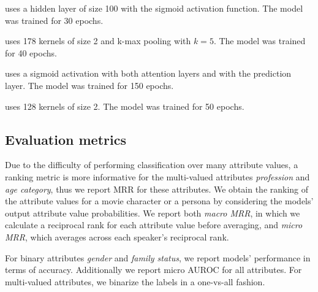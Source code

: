 \squishlist
\item \textbf{} uses a hidden layer of size 100 with the sigmoid activation function. The model was trained for 30 epochs.
\item \textbf{} uses 178 kernels of size 2 and k-max pooling with $k=5$. The model was trained for 40 epochs.
\item \textbf{} uses a sigmoid activation with both attention layers and with the prediction layer.
The model was trained for 150 epochs.
\item \textbf{} uses 128 kernels of size 2. The model was trained for 50 epochs.
\squishend

 \subsection{Evaluation metrics}
\label{metric}

Due to the difficulty of performing classification over many attribute values, a ranking metric is more informative for the multi-valued attributes \textit{profession} and \textit{age category}, thus we report MRR for these attributes. We obtain the ranking of the attribute values for a movie character or a persona by considering the models' output attribute value probabilities.
We report both \textit{macro MRR}, in which we calculate a reciprocal rank for each attribute value before averaging, and \textit{micro MRR}, which averages across each speaker's reciprocal rank.

For binary attributes \textit{gender} and \textit{family status}, we report models' performance in terms of accuracy. Additionally we report micro AUROC for all attributes. For multi-valued attributes, we binarize the labels in a one-vs-all fashion.